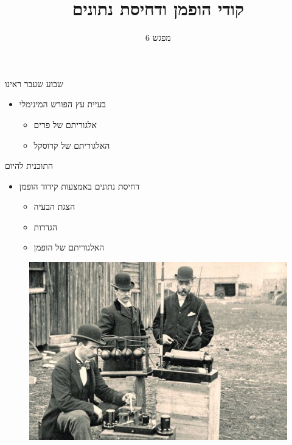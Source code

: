 \documentclass[luatex]{beamer}
\begin{document}
	\title{קודי הופמן ודחיסת נתונים}
	\subtitle{מפגש 6}
	\date{}
	
	
	\frame{\titlepage}
	\begin{frame}{שבוע שעבר ראינו}
	\pause
	
	\begin{itemize}[<+->]
		\item בעיית עץ הפורש המינימלי
		\begin{itemize}[<+->]
			\item אלגוריתם של פרים
			\item האלגוריתם של קרוסקל
		\end{itemize}
	\end{itemize}
\end{frame}

\begin{frame}{התוכנית להיום}
\pause
\begin{itemize}[<+->]
	\item דחיסת נתונים באמצעות קידוד הופמן
	\begin{itemize}[<+->]
		\item הצגת הבעיה
		\item הגדרות
		\item האלגוריתם של הופמן
	\end{itemize}
\end{itemize}
\end{frame}
\begin{frame}
\begin{figure}
	\centering
	\includegraphics[width=\linewidth]{imgs/telegraph}
\end{figure}


\end{frame}
\end{document}
